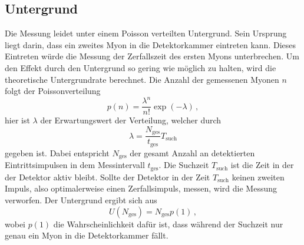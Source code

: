\subsection{Untergrund}
Die Messung leidet unter einem Poisson verteilten Untergrund.
Sein Ursprung liegt darin, dass ein zweites Myon in die Detektorkammer eintreten kann.
Dieses Eintreten würde die Messung der Zerfallszeit des ersten Myons unterbrechen.
Um den Effekt durch den Untergrund so gering wie möglich zu halten, wird die theoretische Untergrundrate berechnet.
Die Anzahl der gemessenen Myonen $n$ folgt der Poissonverteilung
\begin{equation*}
    p(n) = \frac{\lambda^n}{n!} \exp(-\lambda)\, ,
\end{equation*}
hier ist $\lambda$ der Erwartungswert der Verteilung, welcher durch 
\begin{equation*}
    \lambda = \frac{N_\text{ges}}{t_\text{ges}} T_\text{such}
\end{equation*}
gegeben ist.
Dabei entspricht $N_\text{ges}$ der gesamt Anzahl an detektierten Eintrittsimpulsen in dem Messintervall $t_\text{ges}$.
Die Suchzeit $T_\text{such}$ ist die Zeit in der der Detektor aktiv bleibt.
Sollte der Detektor in der Zeit $T_\text{such}$ keinen zweiten Impuls, also optimalerweise einen Zerfallsimpuls, messen, wird die Messung verworfen.
Der Untergrund ergibt sich aus 
\begin{equation}
    U(N_\text{ges}) = N_\text{ges} p(1)\, ,
    \label{eq:untergrund}
\end{equation}
wobei $p(1)$ die Wahrscheinlichkeit dafür ist, dass während der Suchzeit nur genau ein Myon in die Detektorkammer fällt.